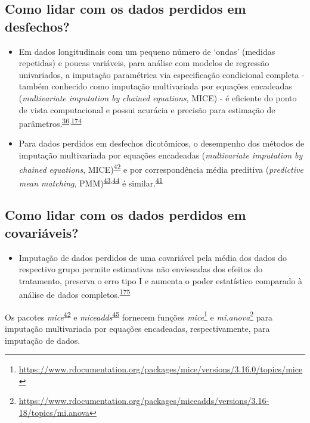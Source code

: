 \documentclass[
  a4paper,
]{book}
\providecommand{\tightlist}{%
  \setlength{\itemsep}{0pt}\setlength{\parskip}{0pt}}
\renewcommand{\href}[2]{#2\footnote{\url{#1}}}
\newenvironment{infobox}[1]
  {
  \begin{itemize}
  \renewcommand{\labelitemi}{
    \raisebox{-.7\height}[0pt][0pt]{
      {\setkeys{Gin}{width=3em,keepaspectratio}
        \texttt{[image: \#1]}}
    }
  }
  \setlength{\fboxsep}{1em}
  \begin{blackbox}
  \item
  }
  {
  \end{blackbox}
  \end{itemize}
  }
\begin{document}
\hypertarget{como-lidar-com-os-dados-perdidos-em-desfechos}{%
\subsection{Como lidar com os dados perdidos em desfechos?}\label{como-lidar-com-os-dados-perdidos-em-desfechos}}

\begin{itemize}
\item
  Em dados longitudinais com um pequeno número de `ondas' (medidas repetidas) e poucas variáveis, para análise com modelos de regressão univariados, a imputação paramétrica via especificação condicional completa - também conhecido como imputação multivariada por equações encadeadas (\emph{multivariate imputation by chained equations}, MICE) - é eficiente do ponto de vista computacional e possui acurácia e precisão para estimação de parâmetros.\textsuperscript{\protect\hyperlink{ref-Heymans2022}{36},\protect\hyperlink{ref-Cao2022}{174}}
\item
  Para dados perdidos em desfechos dicotômicos, o desempenho dos métodos de imputação multivariada por equações encadeadas (\emph{multivariate imputation by chained equations}, MICE)\textsuperscript{\protect\hyperlink{ref-mice}{42}} e por correspondência média preditiva (\emph{predictive mean matching}, PMM)\textsuperscript{\protect\hyperlink{ref-rubin1986}{43},\protect\hyperlink{ref-little1988a}{44}} é similar.\textsuperscript{\protect\hyperlink{ref-austin2023}{41}}
\end{itemize}

\hypertarget{como-lidar-com-os-dados-perdidos-em-covariuxe1veis}{%
\subsection{Como lidar com os dados perdidos em covariáveis?}\label{como-lidar-com-os-dados-perdidos-em-covariuxe1veis}}

\begin{itemize}
\tightlist
\item
  Imputação de dados perdidos de uma covariável pela média dos dados do respectivo grupo permite estimativas não enviesadas dos efeitos do tratamento, preserva o erro tipo I e aumenta o poder estatístico comparado à análise de dados completos.\textsuperscript{\protect\hyperlink{ref-Kahan2014}{175}}
\end{itemize}

\begin{infobox}{images/Rlogo}
Os pacotes \emph{mice}\textsuperscript{\protect\hyperlink{ref-mice}{42}} e \emph{miceadds}\textsuperscript{\protect\hyperlink{ref-miceadds}{45}} fornecem funções \href{https://www.rdocumentation.org/packages/mice/versions/3.16.0/topics/mice}{\emph{mice}} e \href{https://www.rdocumentation.org/packages/miceadds/versions/3.16-18/topics/mi.anova}{\emph{mi.anova}} para imputação multivariada por equações encadeadas, respectivamente, para imputação de dados.

\end{infobox}
\end{document}
